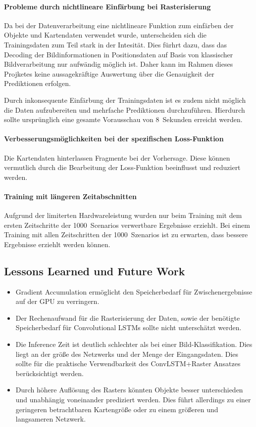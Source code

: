 \documentclass[12pt]{article}
\begin{document}
    \paragraph{Probleme durch nichtlineare Einfärbung bei Rasterisierung} Da bei der Datenverarbeitung eine 
    nichtlineare Funktion zum einfärben der Objekte und Kartendaten verwendet wurde, unterscheiden sich die Trainingsdaten 
    zum Teil stark in der Intesität. Dies fürhrt dazu, dass das Decoding der Bildinformationen in Positionsdaten auf 
    Basis von klassischer Bildverarbeitung nur aufwändig möglich ist. Daher kann im Rahmen dieses Projketes keine aussagekräftige 
    Auswertung über die Genauigkeit der Prediktionen erfolgen.

    Durch inkonsequente Einfärbung der Trainingsdaten ist es zudem nicht möglich die Daten aufzubereiten und mehrfache Prediktionen durchzuführen.
    Hierdurch sollte ursprünglich eine gesamte Vorausschau von 8~Sekunden erreicht werden.

    \paragraph{Verbesserungsmöglichkeiten bei der spezifischen Loss-Funktion} Die Kartendaten hinterlassen Fragmente bei der Vorhersage. 
    Diese können vermutlich durch die Bearbeitung der Loss-Funktion beeinflusst und reduziert werden.
    \paragraph{Training mit längeren Zeitabschnitten} Aufgrund der limiterten Hardwareleistung wurden nur beim Training mit dem ersten 
    Zeitschritte der 1000~Scenarios verwertbare Ergebnisse erziehlt. Bei einem Training mit allen Zeitschritten der 1000~Szenarios ist zu erwarten, 
    dass bessere Ergebnisse erziehlt werden können.

    \subsection{Lessons Learned und Future Work}
        \begin{itemize}
            \item Gradient Accumulation ermöglicht den Speicherbedarf für Zwischenergebnisse auf der GPU zu verringern.
            \item Der Rechenaufwand für die Rasterisierung der Daten, sowie der benötigte Speicherbedarf für Convolutional LSTMs sollte nicht unterschätzt werden.
            \item Die Inference Zeit ist deutlich schlechter als bei einer Bild-Klassifikation. Dies liegt an der größe des Netzwerks und der Menge der Eingangsdaten. Dies sollte für die praktische Verwendbarkeit des ConvLSTM+Raster Ansatzes berücksichtigt werden. 
            \item Durch höhere Auflösung des Rasters könnten Objekte besser unterschieden und unabhängig voneinander prediziert werden. Dies führt allerdings zu einer geringeren betrachtbaren Kartengröße oder zu einem größeren und langsameren Netzwerk.
        \end{itemize}

{}

\end{document}
